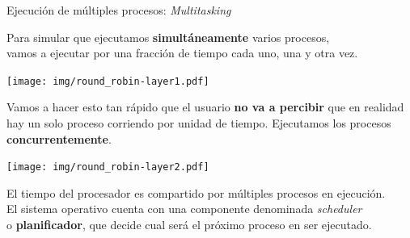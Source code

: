 \documentclass[aspectratio=169]{beamer}
\begin{document}
\begin{frame}{Ejecución de múltiples procesos: \emph{Multitasking}}
    \begin{center}
    Para simular que ejecutamos \textbf{simultáneamente} varios procesos,\\ vamos a ejecutar por una fracción de tiempo cada uno, una y otra vez.
    \end{center}
    \begin{center}
        \texttt{[image: img/round\_robin-layer1.pdf]}
    \end{center}
    \pause
    \textcolor{verdeuca}{Vamos a hacer esto tan rápido que el usuario \textbf{no va a percibir} que en realidad hay un solo proceso corriendo por unidad de tiempo.}
    Ejecutamos los procesos \textbf{concurrentemente}.\\
    \begin{center}
        \texttt{[image: img/round\_robin-layer2.pdf]}
    \end{center}
    \pause
    \begin{center}
    \textcolor{naranjauca}{El tiempo del procesador es compartido por múltiples procesos en ejecución.}\\
    \vspace{0.2cm}
    \small
    El sistema operativo cuenta con una componente denominada \emph{scheduler}\\ o \textbf{planificador}, que decide cual será el próximo proceso en ser ejecutado.
    \end{center}
\end{frame}
\end{document}
